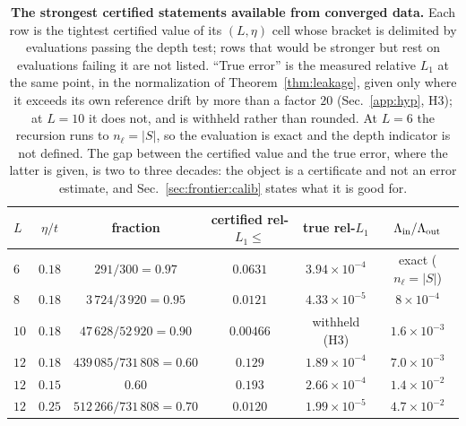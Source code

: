 \begin{table}[t]\centering\small
\caption{\textbf{The strongest certified statements available from converged data.} Each row is the
tightest certified value of its $(L,\eta)$ cell whose bracket is delimited by evaluations passing the depth
test; rows that would be stronger but rest on evaluations failing it are not listed. ``True error'' is
the measured relative $L_1$ at the same point, in the normalization of Theorem~\ref{thm:leakage},
given only where it exceeds its own reference drift by more than a factor $20$ (Sec.~\ref{app:hyp},
H3); at $L=10$ it does not, and is withheld rather than rounded. At $L=6$ the recursion runs to
$n_\ell=\lvert S\rvert$, so the evaluation is exact and the depth indicator is not defined. The gap
between the certified value and the true error, where the latter is given, is two to three decades: the
object is a certificate and not an error estimate, and Sec.~\ref{sec:frontier:calib} states what it is good
for.}\label{tab:certified}
\setlength{\tabcolsep}{5pt}
\begin{tabular}{lccccc}
\toprule
$L$ & $\eta/t$ & fraction & certified rel-$L_1\le$ & true rel-$L_1$ & $\Lambda_{\rm in}/\Lambda_{\rm out}$\\
\midrule
%
%
%
%
%
%
$6$  & $0.18$ & $291/300=0.97$            & $0.0631$ & $3.94\times10^{-4}$ & exact ($n_\ell=\lvert S\rvert$)\\
$8$  & $0.18$ & $3\,724/3\,920=0.95$      & $0.0121$ & $4.33\times10^{-5}$ & $8\times10^{-4}$\\
$10$ & $0.18$ & $47\,628/52\,920=0.90$    & $0.00466$ & withheld (H3)       & $1.6\times10^{-3}$\\
$12$ & $0.18$ & $439\,085/731\,808=0.60$  & $0.129$ & $1.89\times10^{-4}$ & $7.0\times10^{-3}$\\
$12$ & $0.15$ & $0.60$                    & $0.193$ & $2.66\times10^{-4}$ & $1.4\times10^{-2}$\\
$12$ & $0.25$ & $512\,266/731\,808=0.70$  & $0.0120$ & $1.99\times10^{-5}$ & $4.7\times10^{-2}$\\
\bottomrule
\end{tabular}
\end{table}

